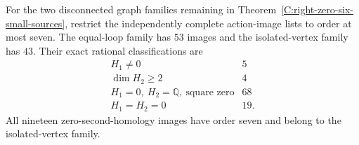 \begin{lemma}
\label{C:six-state-rational-image-controls}
For the two disconnected graph families remaining
in Theorem~\ref{C:right-zero-six-small-sources},
restrict the independently complete action-image
lists to order at most seven.  The equal-loop family
has $53$ images and the isolated-vertex family has
$43$.  Their exact rational classifications are
\[
\begin{array}{c|r}
H_1\ne0&5\\
\dim H_2\geq2&4\\
H_1=0,\ H_2=\mathbb Q,\ \text{square zero}&68\\
H_1=H_2=0&19.
\end{array}
\]
All nineteen zero-second-homology images have order
seven and belong to the isolated-vertex family.
\end{lemma}
